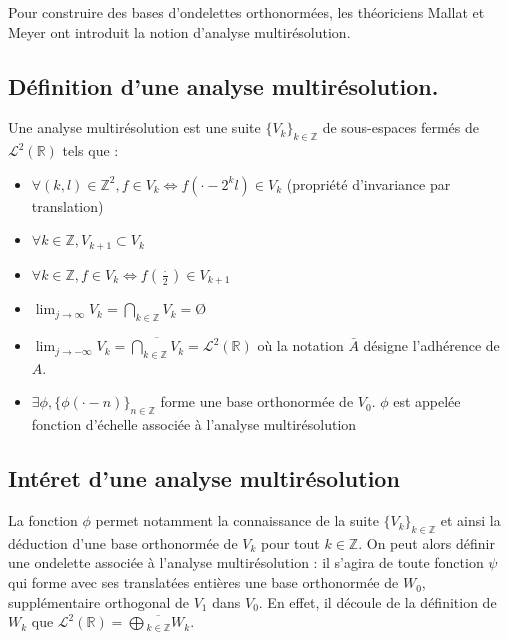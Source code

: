 \documentclass{article}
\begin{document}
Pour construire des bases d'ondelettes orthonormées, les théoriciens Mallat et Meyer ont introduit la notion d'analyse multirésolution.

\subsection{Définition d'une analyse multirésolution.}

Une analyse multirésolution est une suite $\{V_k\}_{k\in\mathbb{Z}}$ de sous-espaces fermés de $\mathcal{L}^2(\mathbb{R})$ tels que : \\

\begin{itemize}
\item $\forall{}(k,l) \in \mathbb{Z}^2, f \in V_k \Leftrightarrow f(\cdot - 2^{k}l) \in V_k $ (propriété d'invariance par translation)

\item $\forall k \in \mathbb{Z}, V_{k+1} \subset V_k$

\item $\forall k \in \mathbb{Z}, f \in V_k \Leftrightarrow f(\frac{\cdot}{2}) \in V_{k+1}$

\item $\displaystyle \lim_{j \to \infty} V_k = \bigcap_{k\in\mathbb{Z}}V_k = \textrm{Ø} $

\item $\displaystyle \lim_{j \to -\infty} V_k = \overline{\bigcap_{k\in\mathbb{Z}}V_k} = \mathcal{L}^2(\mathbb{R}) $ où la notation $\bar{A}$ désigne l'adhérence de $A$.

\item $\exists\phi, \{\phi(\cdot - n)\}_{n \in \mathbb{Z}}$ forme une base orthonormée de $V_0$. $\phi$ est appelée fonction d'échelle associée à l'analyse multirésolution
\end{itemize}

\subsection{Intéret d'une analyse multirésolution}

La fonction $\phi$ permet notamment la connaissance de la suite $\{V_k\}_{k\in\mathbb{Z}}$ et ainsi la déduction d'une base orthonormée de $V_k$ pour tout $k \in \mathbb{Z}$. On peut alors définir une ondelette associée à l'analyse multirésolution : il s'agira de toute fonction $\psi$ qui forme avec ses translatées entières une base orthonormée de $W_0$, supplémentaire orthogonal de $V_1$ dans $V_0$. En effet, il découle de la définition de $W_k$ que $\displaystyle \mathcal{L}^2(\mathbb{R}) = \overline{\bigoplus{}_{k\in\mathbb{Z}}W_k}$. \\
\end{document}
